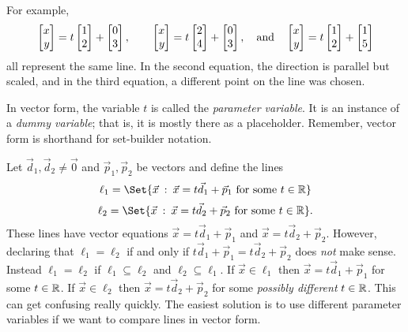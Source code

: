 For example,
\[
	\mat{x\\y} = t\mat{1\\2}+\mat{0\\3},\qquad
	\mat{x\\y} = t\mat{2\\4}+\mat{0\\3},\quad\text{and}\quad
	\mat{x\\y} = t\mat{1\\2}+\mat{1\\5}
\]
all represent the same line.  In the second equation, the direction is parallel but scaled, and in 
the third equation, a different point on the line was chosen.

In vector form, the variable $t$ is called the \emph{parameter variable}.  It is an instance of
a \emph{dummy variable}; that is, it is mostly there as a placeholder.  Remember, vector
form is shorthand for set-builder notation.  

Let $\vec d_1,\vec d_2\neq\vec 0$ and $\vec p_1,\vec p_2$ be vectors and define the lines
\[
	\ell_1=\Set{\vec x\given \vec x=t\vec d_1+\vec p_1\text{ for some }t\in\R}
\]
\[
	\ell_2=\Set{\vec x\given \vec x=t\vec d_2+\vec p_2\text{ for some }t\in\R}.
\]
These lines have vector equations $\vec x=t\vec d_1+\vec p_1$ and $\vec x=t\vec d_2+\vec p_2$.
However, declaring that $\ell_1=\ell_2$ if and only if $t\vec d_1+\vec p_1=t\vec d_2+\vec p_2$
does \emph{not} make sense.   Instead $\ell_1=\ell_2$ if $\ell_1\subseteq\ell_2$ and $\ell_2\subseteq\ell_1$.
If $\vec x\in\ell_1$ then $\vec x=t\vec d_1+\vec p_1$ for some $t\in\mathbb{R}$.  If $\vec x\in\ell_2$
then $\vec x=t\vec d_2+\vec p_2$ for some \emph{possibly different} $t\in \mathbb{R}$.  This can get
confusing really quickly.  The easiest solution is to use different parameter variables if
we want to compare lines in vector form.


